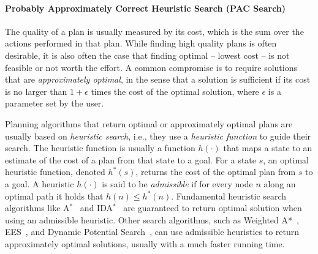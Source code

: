 \documentclass[12pt]{article}
\begin{document}
\paragraph{Probably Approximately Correct Heuristic Search (PAC Search)} 
The quality of a plan is usually measured by its cost, which is the sum over the actions performed in that plan. While finding high quality plans is often desirable, it is also often the case that finding optimal -- lowest cost -- is  not feasible or not worth the effort. A common compromise is to require solutions that are {\em approximately optimal}, in the sense that a solution is sufficient if its cost is no larger than $1+\epsilon$ times the cost of the optimal solution, where $\epsilon$ is a parameter set by the user. 

Planning algorithms that return optimal or approximately optimal plans are usually based on {\em heuristic search}, i.e., they use a {\em heuristic function} to guide their search. The heuristic function is usually a function $h(\cdot)$ that maps a state to an estimate of the cost of a plan from that state to a goal. For a state $s$, an optimal heuristic function, denoted $h^*(s)$, returns the cost of the optimal plan from $s$ to a goal. A heuristic $h(\cdot)$  is said to be {\em admissible} if for every node $n$ along an optimal path it holds that $h(n)\leq h^*(n)$. Fundamental heuristic search algorithms like A$^*$~\cite{hart1968formal} and IDA$^*$~\cite{korf1985depth} are guaranteed to return optimal solution when using an admissible heuristic. Other search algorithms, such as Weighted A*~\cite{pohl1973avoidance}, EES~\cite{thayer2011bounded}, and Dynamic Potential Search~\cite{gilon2016dynamic}, can use admissible heuristics to return approximately optimal solutions, usually with a much faster running time. 
\end{document}
